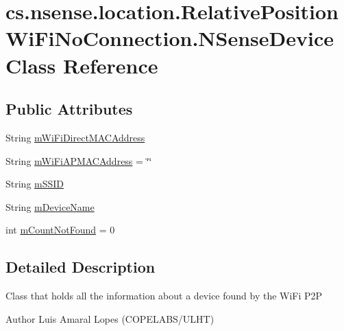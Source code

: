 \hypertarget{classcs_1_1nsense_1_1location_1_1_relative_position_wi_fi_no_connection_1_1_n_sense_device}{\section{cs.\-nsense.\-location.\-Relative\-Position\-Wi\-Fi\-No\-Connection.\-N\-Sense\-Device Class Reference}
\label{classcs_1_1nsense_1_1location_1_1_relative_position_wi_fi_no_connection_1_1_n_sense_device}
}
\subsection*{Public Attributes}
\begin{DoxyCompactItemize}
\item 
String \hyperlink{classcs_1_1nsense_1_1location_1_1_relative_position_wi_fi_no_connection_1_1_n_sense_device_aa5f006f0eb7d96f17d0898bca82d6e37}{m\-Wi\-Fi\-Direct\-M\-A\-C\-Address}
\item 
String \hyperlink{classcs_1_1nsense_1_1location_1_1_relative_position_wi_fi_no_connection_1_1_n_sense_device_a04e81ad89c458ec26933f3932fc03861}{m\-Wi\-Fi\-A\-P\-M\-A\-C\-Address} = \char`\"{}\char`\"{}
\item 
String \hyperlink{classcs_1_1nsense_1_1location_1_1_relative_position_wi_fi_no_connection_1_1_n_sense_device_ae39f3eeb260b5a3b43fa3e4bd8c0cdcb}{m\-S\-S\-I\-D}
\item 
String \hyperlink{classcs_1_1nsense_1_1location_1_1_relative_position_wi_fi_no_connection_1_1_n_sense_device_a58c7aed653c6529203f48761a8d282de}{m\-Device\-Name}
\item 
int \hyperlink{classcs_1_1nsense_1_1location_1_1_relative_position_wi_fi_no_connection_1_1_n_sense_device_addb77c138f199e25c80f3d04af4a35bf}{m\-Count\-Not\-Found} = 0
\end{DoxyCompactItemize}


\subsection{Detailed Description}
Class that holds all the information about a device found by the Wi\-Fi P2\-P \begin{DoxyAuthor}{Author}
Luis Amaral Lopes (C\-O\-P\-E\-L\-A\-B\-S/\-U\-L\-H\-T) 
\end{DoxyAuthor}


